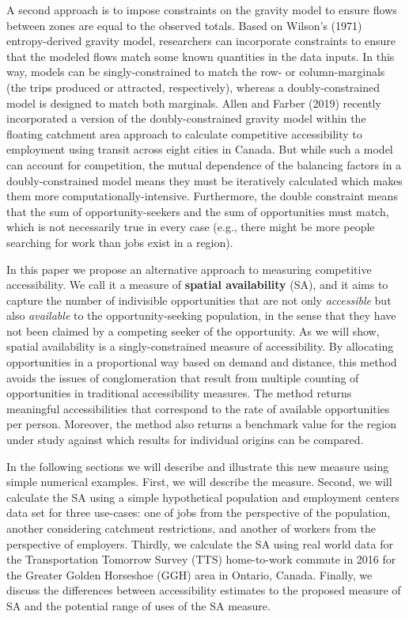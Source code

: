 \documentclass[]{elsarticle} %
\begin{document}
A second approach is to impose constraints on the gravity model to
ensure flows between zones are equal to the observed totals. Based on
Wilson's (1971) entropy-derived gravity model, researchers can
incorporate constraints to ensure that the modeled flows match some
known quantities in the data inputs. In this way, models can be
singly-constrained to match the row- or column-marginals (the trips
produced or attracted, respectively), whereas a doubly-constrained model
is designed to match both marginals. Allen and Farber (2019) recently
incorporated a version of the doubly-constrained gravity model within
the floating catchment area approach to calculate competitive
accessibility to employment using transit across eight cities in Canada.
But while such a model can account for competition, the mutual
dependence of the balancing factors in a doubly-constrained model means
they must be iteratively calculated which makes them more
computationally-intensive. Furthermore, the double constraint means that
the sum of opportunity-seekers and the sum of opportunities must match,
which is not necessarily true in every case (e.g., there might be more
people searching for work than jobs exist in a region).

In this paper we propose an alternative approach to measuring
competitive accessibility. We call it a measure of \textbf{spatial
availability} (SA), and it aims to capture the number of indivisible
opportunities that are not only \emph{accessible} but also
\emph{available} to the opportunity-seeking population, in the sense
that they have not been claimed by a competing seeker of the
opportunity. As we will show, spatial availability is a
singly-constrained measure of accessibility. By allocating opportunities
in a proportional way based on demand and distance, this method avoids
the issues of conglomeration that result from multiple counting of
opportunities in traditional accessibility measures. The method returns
meaningful accessibilities that correspond to the rate of available
opportunities per person. Moreover, the method also returns a benchmark
value for the region under study against which results for individual
origins can be compared.

In the following sections we will describe and illustrate this new
measure using simple numerical examples. First, we will describe the
measure. Second, we will calculate the SA using a simple hypothetical
population and employment centers data set for three use-cases: one of
jobs from the perspective of the population, another considering
catchment restrictions, and another of workers from the perspective of
employers. Thirdly, we calculate the SA using real world data for the
Transportation Tomorrow Survey (TTS) home-to-work commute in 2016 for
the Greater Golden Horseshoe (GGH) area in Ontario, Canada. Finally, we
discuss the differences between accessibility estimates to the proposed
measure of SA and the potential range of uses of the SA measure.
\end{document}
